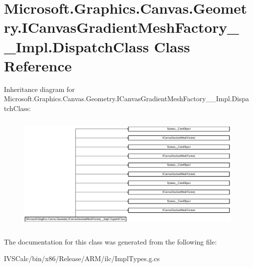 \hypertarget{class_microsoft_1_1_graphics_1_1_canvas_1_1_geometry_1_1_i_canvas_gradient_mesh_factory_____impl_1_1_dispatch_class}{}\section{Microsoft.\+Graphics.\+Canvas.\+Geometry.\+I\+Canvas\+Gradient\+Mesh\+Factory\+\_\+\+\_\+\+Impl.\+Dispatch\+Class Class Reference}
\label{class_microsoft_1_1_graphics_1_1_canvas_1_1_geometry_1_1_i_canvas_gradient_mesh_factory_____impl_1_1_dispatch_class}
Inheritance diagram for Microsoft.\+Graphics.\+Canvas.\+Geometry.\+I\+Canvas\+Gradient\+Mesh\+Factory\+\_\+\+\_\+\+Impl.\+Dispatch\+Class\+:\begin{figure}[H]
\begin{center}
\leavevmode
\includegraphics[height=5.855514cm]{class_microsoft_1_1_graphics_1_1_canvas_1_1_geometry_1_1_i_canvas_gradient_mesh_factory_____impl_1_1_dispatch_class}
\end{center}
\end{figure}


The documentation for this class was generated from the following file\+:\begin{DoxyCompactItemize}
\item 
I\+V\+S\+Calc/bin/x86/\+Release/\+A\+R\+M/ilc/Impl\+Types.\+g.\+cs\end{DoxyCompactItemize}
